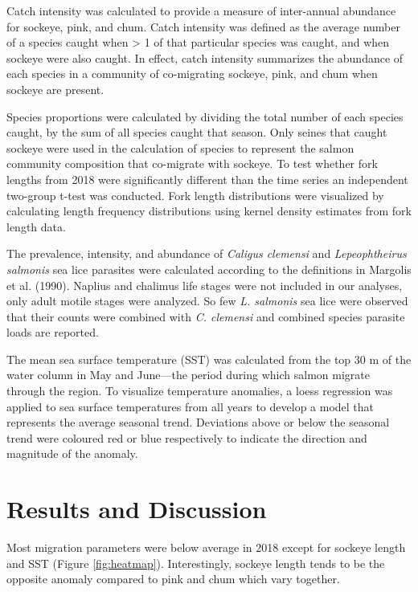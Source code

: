 \documentclass[fleqn,10pt]{wlpeerj} %
\begin{document}
Catch intensity was calculated to provide a measure of inter-annual
abundance for sockeye, pink, and chum. Catch intensity was defined as
the average number of a species caught when \textgreater{} 1 of that
particular species was caught, and when sockeye were also caught. In
effect, catch intensity summarizes the abundance of each species in a
community of co-migrating sockeye, pink, and chum when sockeye are
present.

Species proportions were calculated by dividing the total number of each
species caught, by the sum of all species caught that season. Only
seines that caught sockeye were used in the calculation of species to
represent the salmon community composition that co-migrate with sockeye.
To test whether fork lengths from 2018 were significantly different than
the time series an independent two-group t-test was conducted. Fork
length distributions were visualized by calculating length frequency
distributions using kernel density estimates from fork length data.

The prevalence, intensity, and abundance of \emph{Caligus clemensi} and
\emph{Lepeophtheirus salmonis} sea lice parasites were calculated
according to the definitions in Margolis et al. (1990). Naplius and
chalimus life stages were not included in our analyses, only adult
motile stages were analyzed. So few \emph{L. salmonis} sea lice were
observed that their counts were combined with \emph{C. clemensi} and
combined species parasite loads are reported.

The mean sea surface temperature (SST) was calculated from the top 30 m
of the water column in May and June---the period during which salmon
migrate through the region. To visualize temperature anomalies, a loess
regression was applied to sea surface temperatures from all years to
develop a model that represents the average seasonal trend. Deviations
above or below the seasonal trend were coloured red or blue respectively
to indicate the direction and magnitude of the anomaly.

\section{Results and Discussion}\label{results-and-discussion}

Most migration parameters were below average in 2018 except for sockeye
length and SST (Figure \ref{fig:heatmap}). Interestingly, sockeye length
tends to be the opposite anomaly compared to pink and chum which vary
together.
\end{document}
